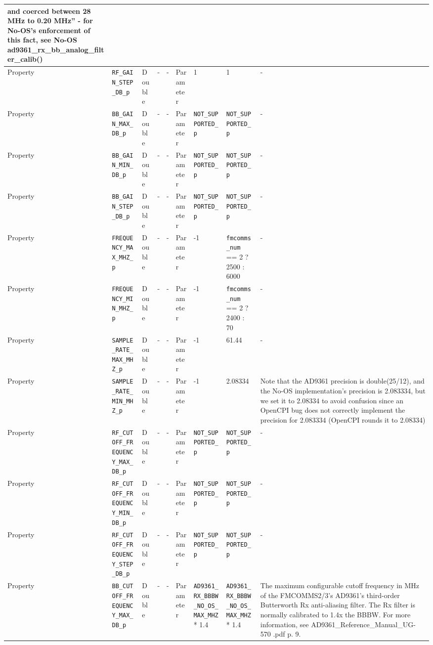 \documentclass{article}
\begin{document}
\begin{landscape}
\begin{scriptsize}
\begin{longtable}{|p{1.8cm}|p{4.1cm}|p{1cm}|c|c|p{1.6cm}|p{3.7cm}|p{3.7cm}|p{2.5cm}|}
        and coerced between 28 MHz to 0.20 MHz'' - for No-OS's enforcement of
        this fact, see No-OS ad9361\_rx\_bb\_analog\_filter\_calib()  \\
			\hline
			Property     & \verb+RF_GAIN_STEP_DB_p+ & Double & -       & -          & Parameter & 1 & 1 & - \\
			\hline
			Property     & \verb+BB_GAIN_MAX_DB_p+ & Double & -       & -          & Parameter & \verb+NOT_SUPPORTED_p+ & \verb+NOT_SUPPORTED_p+ & - \\
			\hline
			Property     & \verb+BB_GAIN_MIN_DB_p+ & Double & -       & -          & Parameter & \verb+NOT_SUPPORTED_p+ & \verb+NOT_SUPPORTED_p+ & - \\
			\hline
			Property     & \verb+BB_GAIN_STEP_DB_p+ & Double & -       & -          & Parameter & \verb+NOT_SUPPORTED_p+ & \verb+NOT_SUPPORTED_p+ & - \\
			\hline
			Property     & \verb+FREQUENCY_MAX_MHZ_p+                   & Double&-        & -          & Parameter & -1 & \verb+fmcomms_num+ == 2 ? 2500 : 6000 & - \\
			\hline
			Property     & \verb+FREQUENCY_MIN_MHZ_p+                   & Double&-        & -          & Parameter & -1 & \verb+fmcomms_num+ == 2 ? 2400 : 70 & - \\
			\hline
			Property     & \verb+SAMPLE_RATE_MAX_MHZ_p+                   & Double&-        & -          & Parameter & -1 & 61.44 & - \\
			\hline
			Property     & \verb+SAMPLE_RATE_MIN_MHZ_p+                   & Double&-        & -          & Parameter & -1 & 2.08334 & Note that the AD9361 precision is double(25/12), and the No-OS implementation's precision is 2.083334, but we set it to 2.08334 to avoid confusion since an OpenCPI bug does not correctly implement the precision for 2.083334 (OpenCPI rounds it to 2.08334) \\
			\hline
			Property     & \verb+RF_CUTOFF_FREQUENCY_MAX_DB_p+ & Double & -       & -          & Parameter & \verb+NOT_SUPPORTED_p+ & \verb+NOT_SUPPORTED_p+ & - \\
			\hline
			Property     & \verb+RF_CUTOFF_FREQUENCY_MIN_DB_p+ & Double & -       & -          & Parameter & \verb+NOT_SUPPORTED_p+ & \verb+NOT_SUPPORTED_p+ & - \\
			\hline
			Property     & \verb+RF_CUTOFF_FREQUENCY_STEP_DB_p+ & Double & -       & -          & Parameter & \verb+NOT_SUPPORTED_p+ & \verb+NOT_SUPPORTED_p+ & - \\
			\hline
			Property     & \verb+BB_CUTOFF_FREQUENCY_MAX_DB_p+ & Double & -       & -          & Parameter & \verb+AD9361_RX_BBBW_NO_OS_MAX_MHZ+ * 1.4 & \verb+AD9361_RX_BBBW_NO_OS_MAX_MHZ+ * 1.4 &
The maximum configurable cutoff frequency in MHz of the FMCOMMS2/3's AD9361's third-order Butterworth Rx anti-aliasing filter. The Rx filter is normally calibrated to 1.4x the BBBW. For more information, see AD9361\_Reference\_Manual\_UG-570    .pdf p. 9.


\end{longtable}
\end{scriptsize}
\end{landscape}
\end{document}

